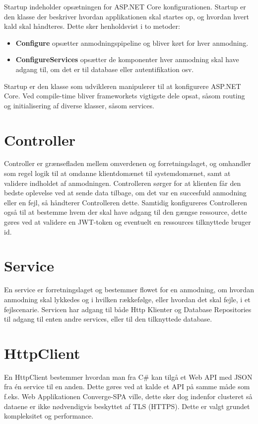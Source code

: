 Startup indeholder opsætningen for ASP.NET Core konfigurationen. Startup er den klasse der beskriver hvordan applikationen skal startes op, og hvordan hvert kald skal håndteres. Dette sker henholdsvist i to metoder:

\begin{itemize}
  \item \textbf{Configure}  opsætter anmodningspipeline og bliver kørt for hver anmodning.
  \item \textbf{ConfigureServices} opsætter de komponenter hver anmodning skal have adgang til, om det er til database eller autentifikation osv.
\end{itemize}

Startup er den klasse som udvikleren manipulerer til at konfigurere ASP.NET Core. Ved compile-time bliver frameworkets vigtigste dele opsat, såsom routing og initialisering af diverse klasser, såsom services.

\section{Controller}

Controller er grænsefladen mellem omverdenen og forretningslaget, og omhandler som regel logik til at omdanne klientdomænet til systemdomænet, samt at validere indholdet af anmodningen. Controlleren sørger for at klienten får den bedste oplevelse ved at sende data tilbage, om det var en succesfuld anmodning eller en fejl, så håndterer Controlleren dette. Samtidig konfigureres Controlleren også til at bestemme hvem der skal have adgang til den gængse ressource, dette gøres ved at validere en JWT-token og eventuelt en ressources tilknyttede bruger id.

\section{Service}

En service er forretningslaget og bestemmer flowet for en anmodning, om hvordan anmodning skal lykkedes og i hvilken rækkefølge, eller hvordan det skal fejle, i et fejlscenarie. Servicen har adgang til både Http Klienter og Database Repositories til adgang til enten andre services, eller til den tilknyttede database.

\section{HttpClient}

En HttpClient bestemmer hvordan man fra C\# kan tilgå et Web API med JSON fra én service til en anden. Dette gøres ved at kalde et API på samme måde som f.eks. Web Applikationen Converge-SPA ville, dette sker dog indenfor clusteret så dataene er ikke nødvendigvis beskyttet af TLS (HTTPS). Dette er valgt grundet kompleksitet og performance.

